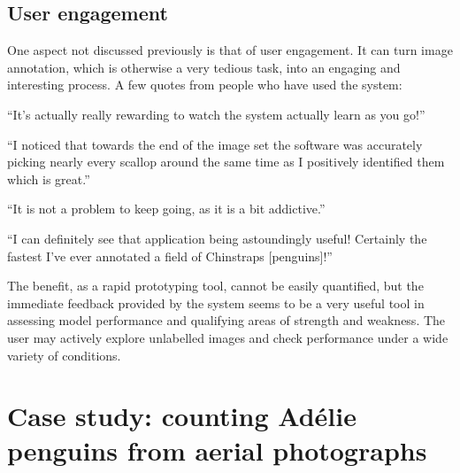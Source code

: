 \subsection{User engagement}
\label{sec:engagement}

One aspect not discussed previously is that of user engagement. It can turn image annotation, which is otherwise a very tedious task, into an engaging and interesting process. A few quotes from people who have used the system:

\begin{displayquote}
``It's actually really rewarding to watch the system actually learn as you go!''
\end{displayquote}

\begin{displayquote}
``I noticed that towards the end of the image set the software was accurately picking nearly every scallop around the same time as I positively identified them which is great.''
\end{displayquote}

\begin{displayquote}
 ``It is not a problem to keep going, as it is a bit addictive.''
\end{displayquote}

\begin{displayquote}
``I can definitely see that application being astoundingly useful! Certainly the fastest I've ever annotated a field of Chinstraps [penguins]!''
\end{displayquote}

The benefit, as a rapid prototyping tool, cannot be easily quantified, but the immediate feedback provided by the system seems to be a very useful tool in assessing model performance and qualifying areas of strength and weakness. The user may actively explore unlabelled images and check performance under a wide variety of conditions.


\section{Case study: counting Ad\'elie penguins from aerial photographs}
\label{sec:case_penguins}

